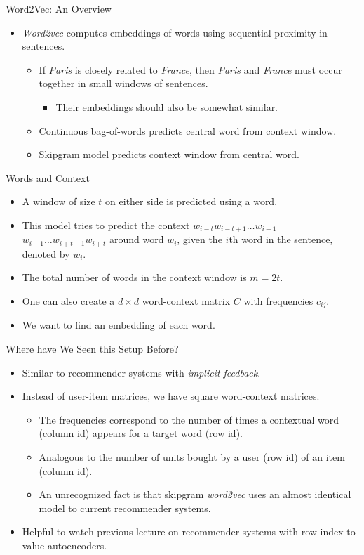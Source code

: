 \begin{frame}{Word2Vec: An Overview}
\begin{itemize}
\item {\em Word2vec} computes embeddings of words using  sequential
proximity in sentences.
\begin{itemize}
\item If {\em Paris} is closely related to {\em France}, then
{\em Paris} and {\em France} must occur together in small windows of
sentences.
\begin{itemize}
\item Their embeddings should also be somewhat similar.
\end{itemize}
\item Continuous bag-of-words predicts central word from context window.
\item Skipgram model predicts context window from central word.
\end{itemize}
\end{itemize}
\end{frame}


\begin{frame}{Words and Context}
\begin{itemize}
\item A window of size $t$ on either side is predicted using a word.
\item  This model tries to predict the context  $w_{i-t} w_{i-t+1}
\ldots w_{i-1}$ $w_{i+1} \ldots w_{i+t-1}  w_{i+t}$  around word
$w_i$, given the $i$th word in the sentence, denoted by $w_i$.
\item The total number of words in the context window is $m=2t$.
\item One can also create a $d \times d$  word-context matrix $C$ with frequencies
$c_{ij}$.
\item  We want to find an embedding of each word.
\end{itemize}
\end{frame}


\begin{frame}{Where have We Seen this Setup Before?}
\begin{itemize}
\item  Similar to recommender  systems with {\em implicit feedback}.
\item Instead of user-item
matrices, we have  square word-context matrices.
\begin{itemize}
\item The frequencies correspond to the number of times a  contextual word (column id) appears for a target word (row id).
\item Analogous to the number of units bought  by a user (row id) of  an item (column id).
\item An unrecognized fact is that skipgram {\em word2vec} uses an
almost identical model to current recommender systems.
\end{itemize}
\item Helpful to watch previous lecture on
recommender systems with row-index-to-value autoencoders.
\end{itemize}
\end{frame}


